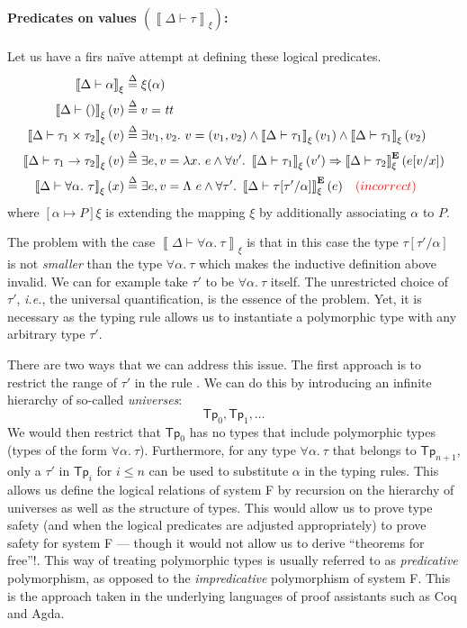 \documentclass{article}
\newcommand{\ie}{\textit{i.e.}}
\newcommand{\TT}{\mathit{tt}}
\newcommand{\UNT}{()}
\newcommand{\defeq}{\overset{\Delta}{=}}
\newcommand{\semtyp}[3]{\left\llbracket #2 \vdash #3 \right\rrbracket_{#1}}
\newcommand{\semErel}[1]{#1^{\textbf{E}}}
\newcommand{\semenv}{\xi}
\newcommand{\TLam}{\Lambda}
\newcommand{\CtxTps}{\Delta}
\newcommand{\expr}{e}
\newcommand{\val}{v}
\newcommand{\var}{x}
\newcommand{\typ}{\tau}
\newcommand{\TForall}{\forall}
\newcommand{\tvar}{\alpha}
\begin{document}
\paragraph{Predicates on values $\left(\semtyp{\semenv}{\CtxTps}{\typ}\right)$:}
Let us have a firs na\"ive attempt at defining these logical
predicates.
\begin{align*}
\semtyp{\semenv}{\CtxTps}{\tvar} \defeq{}& \semenv(\tvar)\\
\semtyp{\semenv}{\CtxTps}{\UNT}(\val) \defeq{}& \val = \TT\\
\semtyp{\semenv}{\CtxTps}{\typ_1 \times \typ_2}(\val) \defeq{}& \exists \val_1, \val_2.~\val = (\val_1, \val_2) \land
\semtyp{\semenv}{\CtxTps}{\typ_1}(\val_1) \land \semtyp{\semenv}{\CtxTps}{\typ_1}(\val_2)\\
\semtyp{\semenv}{\CtxTps}{\typ_1 \to \typ_2}(\val) \defeq{}& \exists \expr, \val = \lambda \var.~\expr\land
\forall \val'.~\semtyp{\semenv}{\CtxTps}{\typ_1}(\val') \Rightarrow \semErel{\semtyp{\semenv}{\CtxTps}{\typ_2}}(\expr[\val/\var])\\
\semtyp{\semenv}{\CtxTps}{\TForall \tvar.~\typ}(\var) \defeq{}& \exists \expr, \val = \TLam~\expr\land
\forall \typ'.~\semErel{\semtyp{\semenv}{\CtxTps}{\typ[\typ'/\tvar]}}(\expr) \hspace{1em} {\color{red}(incorrect)}
\end{align*}
where $[\tvar \mapsto P]\semenv$ is extending the mapping $\semenv$ by additionally associating $\tvar$ to $P$.

The problem with the case $\semtyp{\semenv}{\CtxTps}{\TForall \tvar.~\typ}$ is that in this case the type $\typ[\typ'/\tvar]$ is not \emph{smaller} than the type $\TForall \tvar.~\typ$ which makes the inductive definition above invalid.
We can for example take $\typ'$ to be $\TForall \tvar.~\typ$ itself.
The unrestricted choice of $\typ'$, \ie{}, the universal quantification, is the essence of the problem.
Yet, it is necessary as the typing rule  allows us to instantiate a polymorphic type with any arbitrary type $\typ'$.

There are two ways that we can address this issue.
The first approach is to restrict the range of $\typ'$ in the rule .
We can do this by introducing an infinite hierarchy of so-called \emph{universes}:
\[\mathsf{Tp}_0, \mathsf{Tp}_1, \dots\]
We would then restrict that $\mathsf{Tp}_0$ has no types that include polymorphic types (types of the form $\TForall \tvar.~\typ$).
Furthermore, for any type $\TForall \tvar.~\typ$ that belongs to $\mathsf{Tp}_{n+1}$, only a $\typ'$ in $\mathsf{Tp}_i$ for $i \le n$ can be used to substitute $\tvar$ in the typing rules.
This allows us define the logical relations of system F by recursion on the hierarchy of universes as well as the structure of types.
This would allow us to prove type safety (and when the logical predicates are adjusted appropriately) to prove safety for system F --- though it would not allow us to derive ``theorems for free''!.
This way of treating polymorphic types is usually referred to as \emph{predicative} polymorphism, as opposed to the \emph{impredicative} polymorphism of system F.
This is the approach taken in the underlying languages of proof assistants such as Coq and Agda.
\end{document}
